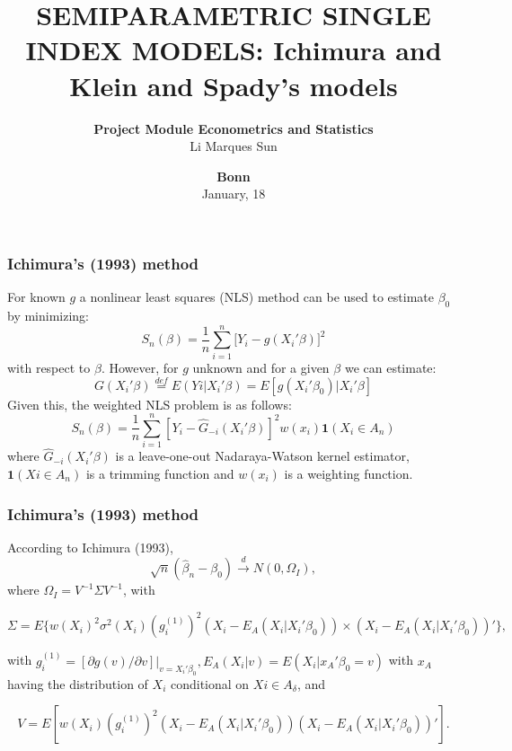 \documentclass[11pt]{beamer}
\begin{document}
\title{SEMIPARAMETRIC SINGLE INDEX MODELS: Ichimura and Klein and Spady's models}

\author[Li Marques Sun] %
{
{\bf Project Module Econometrics and Statistics}\\
{\small Li Marques Sun}\\[1ex]
}

\date{
{\bf Bonn}\\
{\small January, 18}
}


\begin{frame}
    \titlepage
    \note{~}
\end{frame}


\begin{frame}[t]
    \frametitle{Ichimura's (1993) method}
For known $g$ a nonlinear least squares (NLS) method can be used to estimate $\beta_0$ by minimizing:
\begin{equation}
S_n(\beta) = \frac{1}{n}\sum_{i = 1}^n\big[Y_i - g(X_i'\beta)\big]^2
\end{equation}
with respect to $\beta$. However, for $g$ unknown and for a given $\beta$ we can estimate:
\begin{equation}
G(X_i'\beta) \stackrel{def}{=} E(Yi|X_i'\beta) = E[g(X_i'\beta_0)|X_i'\beta]
\end{equation}
Given this, the weighted NLS problem is as follows:
\begin{equation}
S_n(\beta) = \frac{1}{n} \sum_{i=1}^{n}  [Y_i - \hat{G}_{-i}(X_i'\beta)]^2w(x_i)\mathbf{1}{(X_i \in A_n)}
\end{equation}
where $\hat{G}_{-i}(X_i'\beta)$ is a leave-one-out Nadaraya-Watson kernel estimator,  $\mathbf{1}{(Xi \in A_n)}$ is a trimming function and $w(x_i)$ is a weighting function.

\end{frame}

\begin{frame}[t]
    \frametitle{Ichimura's (1993) method}

\begin{theorem}
According to Ichimura (1993),
\[ \sqrt{n}(\hat{\beta}_n - \beta_0) \stackrel{d}{\rightarrow} N(0,\Omega_I), \] where $\Omega_I = V^{-1}\Sigma V^{-1}$, with

\[\Sigma = E\{w(X_i)^2\sigma^2(X_i)(g_i^{(1)})^2(X_i - E_A(X_i|X_i'\beta_0)) \times (X_i - E_A(X_i|X_i'\beta_0))'\},\]

with $g_i^{(1)} = [\partial g(v)/\partial v]|_{v = X_i'\beta_0}, E_A(X_i|v) = E(X_i|x_A'\beta_0 = v)$ with $x_A$ having the distribution of $X_i$ conditional on $Xi \in A_\delta$, and

\[ V = E[w(X_i)(g_i^{(1)})^2(X_i - E_A(X_i|X_i'\beta_0))(X_i - E_A(X_i|X_i'\beta_0))'].\]

\end{theorem}

\end{frame}
\end{document}
